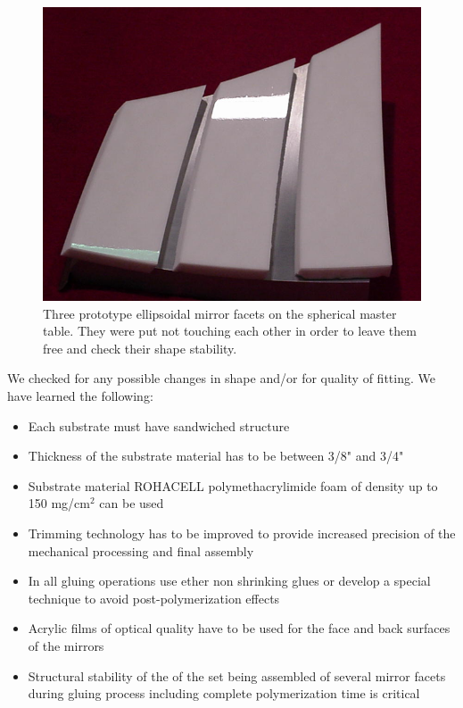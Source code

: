 \begin{figure}[h]
    \centering
    \includegraphics[width=1.0\linewidth]{Prototype.png}
    \caption{Three prototype ellipsoidal mirror facets on the spherical master table. They were put not touching each other in order to leave them free and check their shape stability.}
    \label{fig:Prototype}
\end{figure}{}
We checked for any possible changes in shape and/or for quality of fitting. We have learned the following:
\begin{itemize}
    \item Each substrate must have sandwiched structure
    \item Thickness of the substrate material has to be between 3/8" and 3/4"
    \item Substrate material ROHACELL polymethacrylimide foam of density up to 150 mg/cm$^2$ can be used
    \item Trimming technology has to be improved to provide increased precision of the mechanical processing and final assembly
    \item In all gluing operations use ether non shrinking glues or develop a special technique to avoid post-polymerization effects
    \item Acrylic films of optical quality have to be used for the face and back surfaces of the mirrors
    \item Structural stability of the of the set being assembled of several mirror facets during gluing process including complete polymerization time is critical
    \end{itemize}

